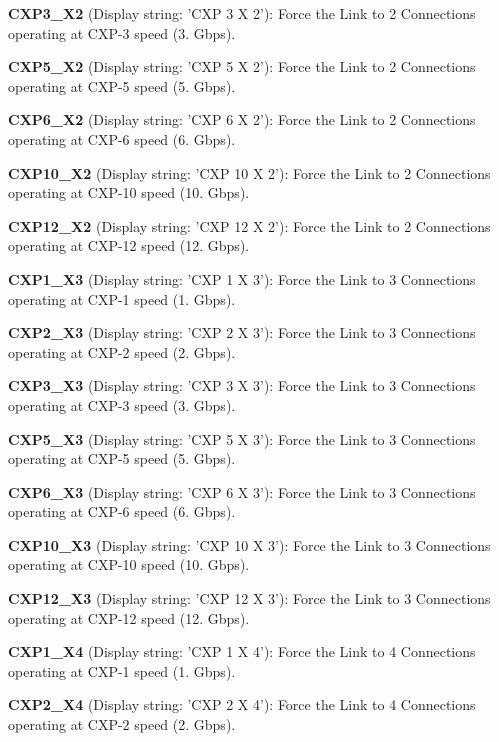 \begin{DoxyItemize}
\item {\bfseries C\+X\+P3\+\_\+\+X2} (Display string\+: 'C\+X\+P 3 X 2')\+: Force the Link to 2 Connections operating at C\+X\+P-\/3 speed (3. Gbps).
\item {\bfseries C\+X\+P5\+\_\+\+X2} (Display string\+: 'C\+X\+P 5 X 2')\+: Force the Link to 2 Connections operating at C\+X\+P-\/5 speed (5. Gbps).
\item {\bfseries C\+X\+P6\+\_\+\+X2} (Display string\+: 'C\+X\+P 6 X 2')\+: Force the Link to 2 Connections operating at C\+X\+P-\/6 speed (6. Gbps).
\item {\bfseries C\+X\+P10\+\_\+\+X2} (Display string\+: 'C\+X\+P 10 X 2')\+: Force the Link to 2 Connections operating at C\+X\+P-\/10 speed (10. Gbps).
\item {\bfseries C\+X\+P12\+\_\+\+X2} (Display string\+: 'C\+X\+P 12 X 2')\+: Force the Link to 2 Connections operating at C\+X\+P-\/12 speed (12. Gbps).
\item {\bfseries C\+X\+P1\+\_\+\+X3} (Display string\+: 'C\+X\+P 1 X 3')\+: Force the Link to 3 Connections operating at C\+X\+P-\/1 speed (1. Gbps).
\item {\bfseries C\+X\+P2\+\_\+\+X3} (Display string\+: 'C\+X\+P 2 X 3')\+: Force the Link to 3 Connections operating at C\+X\+P-\/2 speed (2. Gbps).
\item {\bfseries C\+X\+P3\+\_\+\+X3} (Display string\+: 'C\+X\+P 3 X 3')\+: Force the Link to 3 Connections operating at C\+X\+P-\/3 speed (3. Gbps).
\item {\bfseries C\+X\+P5\+\_\+\+X3} (Display string\+: 'C\+X\+P 5 X 3')\+: Force the Link to 3 Connections operating at C\+X\+P-\/5 speed (5. Gbps).
\item {\bfseries C\+X\+P6\+\_\+\+X3} (Display string\+: 'C\+X\+P 6 X 3')\+: Force the Link to 3 Connections operating at C\+X\+P-\/6 speed (6. Gbps).
\item {\bfseries C\+X\+P10\+\_\+\+X3} (Display string\+: 'C\+X\+P 10 X 3')\+: Force the Link to 3 Connections operating at C\+X\+P-\/10 speed (10. Gbps).
\item {\bfseries C\+X\+P12\+\_\+\+X3} (Display string\+: 'C\+X\+P 12 X 3')\+: Force the Link to 3 Connections operating at C\+X\+P-\/12 speed (12. Gbps).
\item {\bfseries C\+X\+P1\+\_\+\+X4} (Display string\+: 'C\+X\+P 1 X 4')\+: Force the Link to 4 Connections operating at C\+X\+P-\/1 speed (1. Gbps).
\item {\bfseries C\+X\+P2\+\_\+\+X4} (Display string\+: 'C\+X\+P 2 X 4')\+: Force the Link to 4 Connections operating at C\+X\+P-\/2 speed (2. Gbps).

\end{DoxyItemize}
